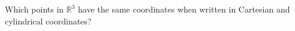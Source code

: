 \begin{problem}
Which points in $\mathbb{R}^3$ have the same coordinates when written in Cartesian and cylindrical coordinates?
\end{problem}